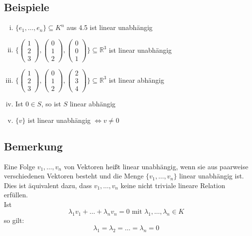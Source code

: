 \subsection{Beispiele} %
\label{sub:beispiele}
\begin{enumerate}[(i)]
	\item $\{ e_1, \ldots , e_n\} \subseteq K^n$ aus 4.5 ist linear unabhängig
	\item $ \Bigg\{ \begin{pmatrix} 1 \\ 2 \\ 3 \end{pmatrix}, \begin{pmatrix} 0 \\ 1 \\ 2 \end{pmatrix}, \begin{pmatrix} 0 \\ 0 \\ 1
	 \end{pmatrix} \Bigg\} \subseteq \mathds{R}^3 $ ist linear unabhängig
	 \item $ \Bigg\{ \begin{pmatrix} 1 \\ 2 \\ 3 \end{pmatrix}, \begin{pmatrix} 0 \\ 1 \\ 2 \end{pmatrix}, \begin{pmatrix} 2 \\ 3 \\ 4
	 \end{pmatrix} \Bigg\} \subseteq \mathds{R}^3 $ ist linear abhängig
	 \item Ist $0 \in S$, so ist $S$ linear abhängig
	 \item $\{v\}$ ist linear unabhängig $\Leftrightarrow v \not= 0$
\end{enumerate}

\subsection{Bemerkung} %
\label{sub:bemerkung}
Eine Folge $v_1, \ldots , v_n$ von Vektoren heißt linear unabhängig, wenn sie aus paarweise verschiedenen Vektoren besteht und die Menge
$\{ v_1, \ldots  , v_n \}$ linear unabhängig ist. Dies ist äquivalent dazu, dass $v_1, \ldots , v_n$ keine nicht triviale lineare Relation erfüllen. \\
Ist
\[
	\lambda_1 v_1 + \ldots + \lambda_n v_n = 0 \text{ mit } \lambda_1, \ldots , \lambda_n \in K
\]
so gilt:
\[
	\lambda_1 = \lambda_2 = \ldots = \lambda_n = 0
\]

